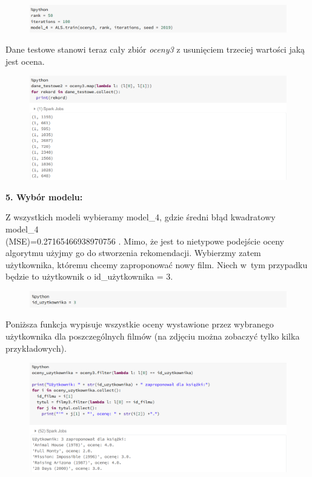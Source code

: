 \documentclass[12pt,a4paper]{report}
\begin{document}
\begin{figure}[H]
\includegraphics[scale=0.5]{obrazy/ALS13.PNG} 
\end{figure}

Dane testowe stanowi teraz cały zbiór \textit{oceny3} z usunięciem trzeciej wartości jaką jest ocena.

\begin{figure}[H]
\includegraphics[scale=0.5]{obrazy/ALS14.PNG} 
\end{figure}

\textbf{5. Wybór modelu:}

Z wszystkich modeli wybieramy model\_4, gdzie średni błąd kwadratowy model\_4 
\\(MSE)=0.27165466938970756 . Mimo, że jest to nietypowe podejście oceny algorytmu użyjmy go do stworzenia rekomendacji. Wybierzmy zatem użytkownika, któremu chcemy zaproponować nowy film. Niech w~tym przypadku będzie to użytkownik o id\_użytkownika = 3.

\begin{figure}[H]
\includegraphics[scale=0.5]{obrazy/ALS15.PNG} 
\end{figure}

Poniższa funkcja wypisuje wszystkie oceny wystawione przez wybranego użytkownika dla poszczególnych filmów (na zdjęciu można zobaczyć tylko kilka przykładowych).

\begin{figure}[H]
\includegraphics[scale=0.5]{obrazy/ALS16.PNG} 
\end{figure}
\end{document}
